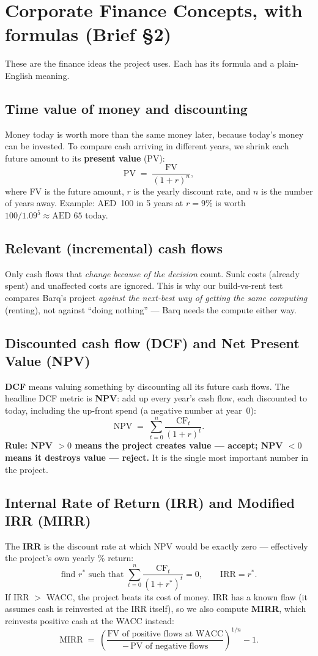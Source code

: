 \documentclass[11pt,a4paper]{article}
\newcommand{\term}[1]{\textcolor{tvblue}{\textbf{#1}}}
\begin{document}
\section{Corporate Finance Concepts, with formulas (Brief \S2)}
These are the finance ideas the project uses. Each has its formula and a plain-English meaning.

\subsection{Time value of money and discounting}
Money today is worth more than the same money later, because today's money can be invested. To
compare cash arriving in different years, we shrink each future amount to its \term{present value}
(PV):
\[
  \text{PV} \;=\; \frac{\text{FV}}{(1+r)^{n}},
\]
where FV is the future amount, $r$ is the yearly discount rate, and $n$ is the number of years away.
Example: AED~100 in 5 years at $r=9\%$ is worth $100/1.09^{5}\approx\text{AED }65$ today.

\subsection{Relevant (incremental) cash flows}
Only cash flows that \emph{change because of the decision} count. Sunk costs (already spent) and
unaffected costs are ignored. This is why our build-vs-rent test compares Barq's project
\emph{against the next-best way of getting the same computing} (renting), not against ``doing
nothing'' --- Barq needs the compute either way.

\subsection{Discounted cash flow (DCF) and Net Present Value (NPV)}
\term{DCF} means valuing something by discounting all its future cash flows. The headline DCF metric
is \term{NPV}: add up every year's cash flow, each discounted to today, including the up-front spend
(a negative number at year~0):
\[
  \text{NPV} \;=\; \sum_{t=0}^{n} \frac{\text{CF}_t}{(1+r)^{t}}.
\]
\textbf{Rule: NPV $>0$ means the project creates value --- accept; NPV $<0$ means it destroys value
--- reject.} It is the single most important number in the project.

\subsection{Internal Rate of Return (IRR) and Modified IRR (MIRR)}
The \term{IRR} is the discount rate at which NPV would be exactly zero --- effectively the project's
own yearly \% return:
\[
  \text{find } r^{*} \text{ such that } \sum_{t=0}^{n}\frac{\text{CF}_t}{(1+r^{*})^{t}} = 0,
  \qquad \text{IRR}=r^{*}.
\]
If IRR $>$ WACC, the project beats its cost of money. IRR has a known flaw (it assumes cash is
reinvested at the IRR itself), so we also compute \term{MIRR}, which reinvests positive cash at the
WACC instead:
\[
  \text{MIRR} \;=\; \left(\frac{\text{FV of positive flows at WACC}}{-\,\text{PV of negative flows}}\right)^{1/n} - 1 .
\]
\end{document}
